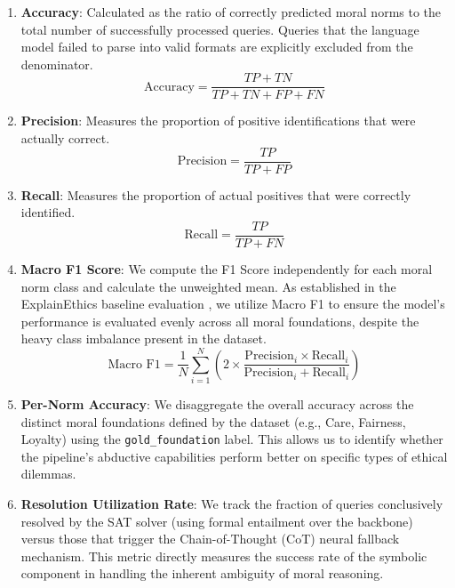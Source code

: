 \begin{enumerate}
    \item \textbf{Accuracy}: Calculated as the ratio of correctly predicted moral norms to the total number of successfully processed queries. Queries that the language model failed to parse into valid formats are explicitly excluded from the denominator.
    \begin{equation}\label{equ:accuracy}
        \text{Accuracy} = \frac{TP + TN}{TP + TN + FP + FN}
    \end{equation}
    
    \item \textbf{Precision}: Measures the proportion of positive identifications that were actually correct.
    \begin{equation}\label{equ:precision}
        \text{Precision} = \frac{TP}{TP + FP}
    \end{equation}
    
    \item \textbf{Recall}: Measures the proportion of actual positives that were correctly identified.
    \begin{equation}\label{equ:recall}
        \text{Recall} = \frac{TP}{TP + FN}
    \end{equation}
    
    \item \textbf{Macro F1 Score}: We compute the F1 Score independently for each moral norm class and calculate the unweighted mean. As established in the ExplainEthics baseline evaluation \citep{quan2024enhancing}, we utilize Macro F1 to ensure the model's performance is evaluated evenly across all moral foundations, despite the heavy class imbalance present in the dataset.
    \begin{equation}\label{equ:macrof1}
        \text{Macro F1} = \frac{1}{N} \sum_{i=1}^{N} \left( 2 \times \frac{\text{Precision}_i \times \text{Recall}_i}{\text{Precision}_i + \text{Recall}_i} \right)
    \end{equation}

    \item \textbf{Per-Norm Accuracy}: We disaggregate the overall accuracy across the distinct moral foundations defined by the dataset (e.g., Care, Fairness, Loyalty) using the \texttt{gold\_foundation} label. This allows us to identify whether the pipeline's abductive capabilities perform better on specific types of ethical dilemmas.
    
    \item \textbf{Resolution Utilization Rate}: We track the fraction of queries conclusively resolved by the SAT solver (using formal entailment over the backbone) versus those that trigger the Chain-of-Thought (CoT) neural fallback mechanism. This metric directly measures the success rate of the symbolic component in handling the inherent ambiguity of moral reasoning.
\end{enumerate}
